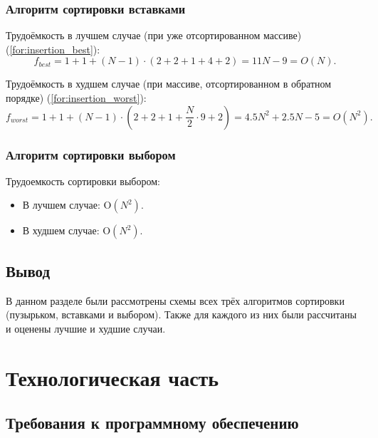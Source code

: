\documentclass[a4paper,14pt, unknownkeysallowed]{extreport}
\begin{document}
\subsection{Алгоритм сортировки вставками}

Трудоёмкость в лучшем случае (при уже отсортированном массиве) (\ref{for:insertion_best}):
\begin{equation}
	\label{for:insertion_best}
    f_{best} = 1 + 1 + (N - 1) \cdot (2 + 2 + 1 + 4 + 2) = 11N - 9 = O(N).
\end{equation}

Трудоёмкость в худшем случае (при массиве, отсортированном в обратном порядке) (\ref{for:insertion_worst}):
\begin{equation}
	\label{for:insertion_worst}
    f_{worst} = 1 + 1 + (N - 1) \cdot (2 + 2 + 1 + \frac{N}{2} \cdot 9 + 2) = 4.5N^2 + 2.5N - 5 = O(N^2).
\end{equation}



\subsection{Алгоритм сортировки выбором}

Трудоемкость сортировки выбором:
\begin{itemize}
    \item В лучшем случае: O$(N^2)$.
    \item В худшем случае: O$(N^2)$.
\end{itemize}

\section{Вывод}

В данном разделе были рассмотрены схемы всех трёх алгоритмов сортировки (пузырьком, вставками и выбором). Также для каждого из них были рассчитаны и оценены лучшие и худшие случаи.





\chapter{Технологическая часть}

\section{Требования к программному обеспечению}
\end{document}
